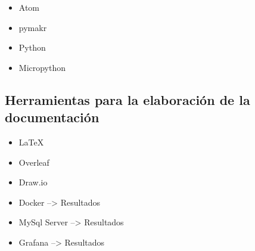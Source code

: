 \begin{itemize}
    \item Atom
    \item pymakr
    \item Python
    \item Micropython
\end{itemize}

\subsection{Herramientas para la elaboración de la documentación}
\label{subsec:metodologia.herramientas.documentacion}

\begin{itemize}
    \item \LaTeX
    \item Overleaf
    \item Draw.io
\end{itemize}

\begin{itemize}
    \item Docker --> Resultados
    \item MySql Server --> Resultados
    \item Grafana --> Resultados
\end{itemize}
